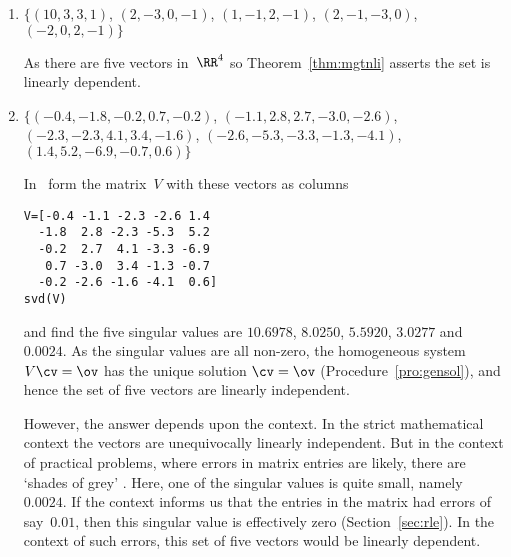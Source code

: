 \begin{example}
\begin{enumerate}
\item \(\{(10,3,3,1)\), \(( 2,-3,0,-1)\), \(( 1,-1,2,-1)\), \(( 2,-1,-3,0)\), \((-2,0,2,-1)\}\)
\begin{solution} 
As there are five vectors in~\(\RR^4\) so Theorem~\ref{thm:mgtnli} asserts the set is linearly dependent.
\end{solution}



\item \(\{(-0.4,-1.8,-0.2, 0.7,-0.2)\), \((-1.1, 2.8, 2.7,-3.0,-2.6)\), \((-2.3,-2.3, 4.1, 3.4,-1.6)\), \((-2.6,-5.3,-3.3,-1.3,-4.1)\), \(( 1.4, 5.2,-6.9,-0.7, 0.6)\}\)
\begin{solution} 
In \script\ form the matrix~\(V\) with these vectors as columns
\begin{verbatim}
V=[-0.4 -1.1 -2.3 -2.6 1.4
  -1.8  2.8 -2.3 -5.3  5.2
  -0.2  2.7  4.1 -3.3 -6.9
   0.7 -3.0  3.4 -1.3 -0.7
  -0.2 -2.6 -1.6 -4.1  0.6]
svd(V)
\end{verbatim}
\setbox\ajrqrbox\hbox{}%
\marginpar{\usebox{\ajrqrbox}}%
and find the five singular values are \(10.6978\), \(8.0250\), \(5.5920\), \(3.0277\) and~\(0.0024\).
As the singular values are all non-zero, the homogeneous system \(V\cv=\ov\) has the unique solution \(\cv=\ov\) (Procedure~\ref{pro:gensol}), and hence the set of five vectors are linearly independent.

However, the answer depends upon the context.  
In the strict mathematical context the vectors are unequivocally linearly independent.
But in the context of practical problems, where errors in matrix entries are likely, there are `shades of grey' . 
Here, one of the singular values is quite small, namely~\(0.0024\).
If the context informs us that the entries in the matrix had errors of say~\(0.01\), then this singular value is effectively zero (Section~\ref{sec:rle}).
In the context of such errors, this set of five vectors would be  linearly dependent.
\end{solution}


\end{enumerate}
\end{example}













